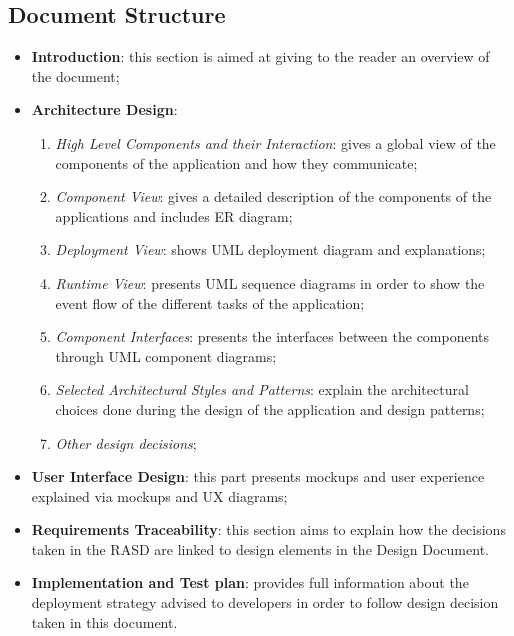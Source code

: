 \documentclass[a4paper]{article}
\begin{document}
\subsection{Document Structure}
\begin{itemize}
    \item \textbf{Introduction}: this section is aimed at giving to the reader an overview of the document;

\item \textbf{Architecture Design}:
\begin{enumerate}
    \item \textit{High Level Components and their Interaction}: gives a global view of the components of the application and how they communicate;

    \item \textit{Component View}: gives a detailed description of the components of the applications and includes ER diagram;

    \item \textit{Deployment View}: shows UML deployment diagram and explanations;

    \item \textit{Runtime View}: presents UML sequence diagrams in order to show the event flow of the different tasks of the application;

    \item \textit{Component Interfaces}: presents the interfaces between the components through UML component diagrams;

    \item \textit{Selected Architectural Styles and Patterns}: explain the architectural choices done during the design of the application and design patterns;

    \item \textit{Other design decisions};
\end{enumerate}

\item \textbf{User Interface Design}: this part presents mockups and user experience explained via mockups and UX diagrams;

\item \textbf{Requirements Traceability}: this section aims to explain how the decisions taken in the RASD are linked to design elements in the Design Document.

\item \textbf{Implementation and Test plan}: provides full information about the deployment strategy advised to developers in order to follow design decision taken in this document.
\end{itemize}
\newpage
\end{document}
